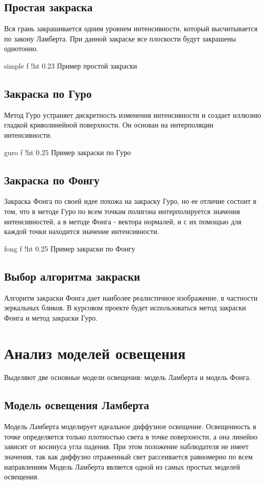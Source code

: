 \subsection{Простая закраска}
Вся грань закрашивается одним уровнем интенсивности, который высчитывается по закону Ламберта. 
При данной закраске все плоскости будут закрашены однотонно.

    {simple}
    {f}
    {!ht}
    {0.23\textwidth}
    {Пример простой закраски}

\subsection{Закраска по Гуро}
Метод Гуро устраняет дискретность изменения интенсивности и создает
иллюзию гладкой криволинейной поверхности. Он основан на интерполяции интенсивности. 

    {guro}
    {f}
    {!ht}
    {0.25\textwidth}
    {Пример закраски по Гуро}

\subsection{Закраска по Фонгу}
Закраска Фонга по своей идее похожа на закраску Гуро, но ее отличие состоит в том, 
что в методе Гуро по всем точкам полигона интерполируется значения интенсивностей, 
а в методе Фонга - вектора нормалей, и с их помощью для каждой точки находится значение интенсивности.

    {fong}
    {f}
    {!ht}
    {0.25\textwidth}
    {Пример закраски по Фонгу}

\subsection{Выбор алгоритма закраски}
Алгоритм закраски Фонга дает наиболее реалистичное изображение, в частности зеркальных бликов. 
В курсовом проекте будет использоваться метод закраски Фонга и метод закраски Гуро.

\newpage

\section{Анализ моделей освещения}
Выделяют две основные модели освещения: модель Ламберта и модель Фонга. 

\subsection{Модель освещения Ламберта}
Модель Ламберта моделирует идеальное диффузное освещение.
Освещенность в точке определяется только плотностью света в точке поверхности, а она линейно зависит от косинуса угла падения. 
При этом положение наблюдателя не имеет значения, так как диффузно отраженный свет рассеивается равномерно по всем направлениям 
Модель Ламберта является одной из самых простых моделей освещения. 

